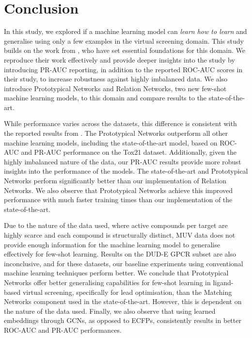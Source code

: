 \section{Conclusion}

In this study, we explored if a machine learning model can \textit{learn how to learn} and generalise using only a few examples in the virtual screening domain. This study builds on the work from \citet{altae2017low}, who have set essential foundations for this domain. We reproduce their work effectively and provide deeper insights into the study by introducing PR-AUC reporting, in addition to the reported ROC-AUC scores in their study, to increase robustness against highly imbalanced data. We also introduce Prototypical Networks and Relation Networks, two new few-shot machine learning models, to this domain and compare results to the state-of-the-art.

While performance varies across the datasets, this difference is consistent with the reported results from \citet{altae2017low}. The Prototypical Networks outperform all other machine learning models, including the state-of-the-art model, based on ROC-AUC and PR-AUC performance on the Tox21 dataset. Additionally, given the highly imbalanced nature of the data, our PR-AUC results provide more robust insights into the performance of the models. The state-of-the-art and Prototypical Networks perform significantly better than our implementation of Relation Networks. We also observe that Prototypical Networks achieve this improved performance with much faster training times than our implementation of the state-of-the-art. 

Due to the nature of the data used, where active compounds per target are highly scarce and each compound is structurally distinct, MUV data does not provide enough information for the machine learning model to generalise effectively for few-shot learning. Results on the DUD-E GPCR subset are also inconclusive, and for these datasets, our baseline experiments using conventional machine learning techniques perform better. We conclude that Prototypical Networks offer better generalising capabilities for few-shot learning in ligand-based virtual screening, specifically for lead optimisation, than the Matching Networks component used in the state-of-the-art. However, this is dependent on the nature of the data used. Finally, we also observe that using learned embeddings through GCNs, as opposed to ECFPs, consistently results in better ROC-AUC and PR-AUC performances.
